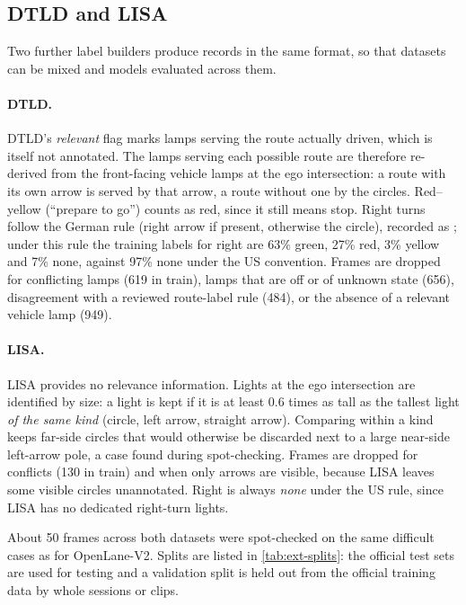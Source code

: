 \subsection{DTLD and LISA}

Two further label builders produce records in the same format, so that datasets can be mixed and models
evaluated across them.

\paragraph{DTLD.} DTLD's \emph{relevant} flag marks lamps serving the route actually driven, which is
itself not annotated. The lamps serving each possible route are therefore re-derived from the
front-facing vehicle lamps at the ego intersection: a route with its own arrow is served by that arrow,
a route without one by the circles. Red--yellow (``prepare to go'') counts as red, since it still means
stop. Right turns follow the German rule (right arrow if present, otherwise the circle), recorded as
; under this rule the training labels for right are 63\% green, 27\% red, 3\%
yellow and 7\% none, against 97\% none under the US convention. Frames are dropped for conflicting
lamps (619 in train), lamps that are off or of unknown state (656), disagreement with a reviewed
route-label rule (484), or the absence of a relevant vehicle lamp (949).

\paragraph{LISA.} LISA provides no relevance information. Lights at the ego intersection are identified
by size: a light is kept if it is at least 0.6 times as tall as the tallest light \emph{of the same
kind} (circle, left arrow, straight arrow). Comparing within a kind keeps far-side circles that would
otherwise be discarded next to a large near-side left-arrow pole, a case found during spot-checking.
Frames are dropped for conflicts (130 in train) and when only arrows are visible, because LISA leaves
some visible circles unannotated. Right is always \emph{none} under the US rule, since LISA has no
dedicated right-turn lights.

About 50 frames across both datasets were spot-checked on the same difficult cases as for OpenLane-V2.
Splits are listed in \cref{tab:ext-splits}: the official test sets are used for testing and a
validation split is held out from the official training data by whole sessions or clips.

